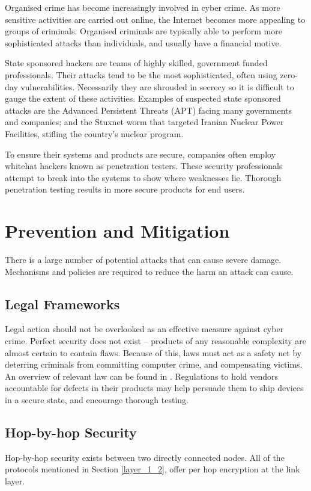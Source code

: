 \documentclass[10pt,journal,compsoc]{IEEEtran}
\begin{document}
Organised crime has become increasingly involved in cyber crime. As more
sensitive activities are carried out online, the Internet becomes more
appealing to groups of criminals. Organised criminals are typically able to
perform more sophisticated attacks than individuals, and usually have a
financial motive. 

State sponsored hackers are teams of highly skilled, government funded
professionals. Their attacks tend to be the most sophisticated, often using
zero-day vulnerabilities. Necessarily they are shrouded in secrecy so it is
difficult to gauge the extent of these activities. Examples of suspected state
sponsored attacks are the Advanced Persistent Threats (APT) facing many
governments and companies; and the Stuxnet worm that targeted Iranian Nuclear
Power Facilities, stifling the country's nuclear program.  

To ensure their systems and products are secure, companies often employ
whitehat hackers known as penetration testers. These security professionals
attempt to break into the systems to show where weaknesses lie. Thorough
penetration testing results in more secure products for end users.

\section{Prevention and Mitigation} 
There is a large number of potential attacks that can cause severe damage.
Mechanisms and policies are required to reduce the harm an attack can cause. 

\subsection{Legal Frameworks}
Legal action should not be overlooked as an effective measure against cyber
crime. Perfect security does not exist \cite{ThereMustBeA} -- products of any
reasonable complexity are almost certain to contain flaws. Because of this,
laws must act as a safety net by deterring criminals from committing computer
crime, and compensating victims. An overview of relevant law can be found in
\cite{Weber2010}. Regulations to hold vendors accountable for defects in their
products may help persuade them to ship devices in a secure state, and
encourage thorough testing. 

\subsection{Hop-by-hop Security}
Hop-by-hop security exists between two directly connected nodes. All of the
protocols mentioned in Section \ref{layer_1_2}, offer per hop encryption at the
link layer. 
\end{document}
